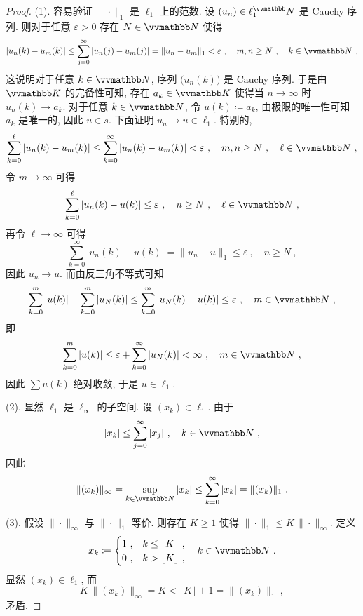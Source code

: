 \begin{proof}
    (1). 容易验证 \(\|\!\cdot\!\|_1\) 是 \(\ell_1\) 上的范数. 设 \((u_n) \in \ell_1^\N\) 是 Cauchy 序列. 则对于任意 \(\varepsilon > 0\) 存在 \(N \in \N\) 使得
    \[
        |u_n(k) - u_m(k)| \leq \sum_{j = 0}^\infty |u_n(j) - u_m(j)| = \|u_n - u_m\|_1 < \varepsilon\ ,\quad m, n \geq N\ ,\quad k \in \N\ ,
    \]
    这说明对于任意 \(k \in \N\), 序列 \(\bigl(u_n(k)\bigr)\) 是 Cauchy 序列. 于是由 \(\K\) 的完备性可知, 存在 \(a_k \in \K\) 使得当 \(n \to \infty\) 时 \(u_n(k) \to a_k\). 对于任意 \(k \in \N\), 令 \(u(k) \coloneqq a_k\), 由极限的唯一性可知 \(a_k\) 是唯一的, 因此 \(u \in s\). 下面证明 \(u_n \to u \in \ell_1\). 特别的,
    \[
        \sum_{k = 0}^\ell |u_n(k) - u_m(k)| \leq \sum_{k = 0}^\infty |u_n(k) - u_m(k)| < \varepsilon\ ,\quad m, n \geq N\ ,\quad \ell \in \N\ ,
    \]
    令 \(m \to \infty\) 可得
    \[
        \sum_{k = 0}^\ell |u_n(k) - u(k)| \leq \varepsilon\ ,\quad n \geq N\ ,\quad \ell \in \N\ ,
    \]
    再令 \(\ell \to \infty\) 可得
    \[
        \sum_{k = 0}^\infty |u_n(k) - u(k)| = \|u_n - u\|_1 \leq \varepsilon\ ,\quad n \geq N\ ,
    \]
    因此 \(u_n \to u\). 而由反三角不等式可知
    \[
        \sum_{k = 0}^m |u(k)| - \sum_{k = 0}^m |u_N(k)| \leq \sum_{k = 0}^m |u_N(k) - u(k)| \leq \varepsilon\ ,\quad m \in \N\ ,
    \]
    即
    \[
        \sum_{k = 0}^m |u(k)| \leq \varepsilon + \sum_{k = 0}^\infty |u_N(k)| < \infty\ ,\quad m \in \N\ ,
    \]
    因此 \(\sum u(k)\) 绝对收敛, 于是 \(u \in \ell_1\).

    (2). 显然 \(\ell_1\) 是 \(\ell_\infty\) 的子空间. 设 \((x_k) \in \ell_1\). 由于
    \[
        |x_k| \leq \sum_{j = 0}^\infty |x_j|\ ,\quad k \in \N\ ,
    \]
    因此
    \[
        \|(x_k)\|_\infty = \sup_{k \in \N} |x_k| \leq \sum_{k = 0}^\infty |x_k| = \|(x_k)\|_1\ .
    \]

    (3). 假设 \(\|\!\cdot\!\|_\infty\) 与 \(\|\!\cdot\!\|_1\) 等价. 则存在 \(K \geq 1\) 使得 \(\|\!\cdot\!\|_1 \leq K\, \|\!\cdot\!\|_\infty\). 定义
    \[
        x_k \coloneqq
        \begin{cases}
            1\ , & k \leq \lfloor K \rfloor\ , \\
            0\ , & k > \lfloor K \rfloor\ ,
        \end{cases}
        \quad k \in \N\ .
    \]
    显然 \((x_k) \in \ell_1\), 而
    \[
         K\, \|(x_k)\|_\infty = K < \lfloor K \rfloor + 1 = \|(x_k)\|_1\ ,
    \]
    矛盾.
\end{proof}

